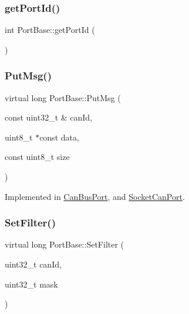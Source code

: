 \subsubsection{\texorpdfstring{get\+Port\+Id()}{getPortId()}}
{\footnotesize\ttfamily int Port\+Base\+::get\+Port\+Id (\begin{DoxyParamCaption}{ }\end{DoxyParamCaption})}

\mbox{\label{classPortBase_a26213ebb6ea0a0b77f60c28944e3bb8e}} 
\subsubsection{\texorpdfstring{Put\+Msg()}{PutMsg()}}
{\footnotesize\ttfamily virtual long Port\+Base\+::\+Put\+Msg (\begin{DoxyParamCaption}\item[{const uint32\+\_\+t \&}]{can\+Id,  }\item[{uint8\+\_\+t $\ast$const}]{data,  }\item[{const uint8\+\_\+t}]{size }\end{DoxyParamCaption})\hspace{0.3cm}{\ttfamily [pure virtual]}}



Implemented in \hyperlink{classCanBusPort_a2bb802ad7a14e260f0f51b79d4c53c43}{Can\+Bus\+Port}, and \hyperlink{classSocketCanPort_a9375a0c1e33978c83ebd188100898633}{Socket\+Can\+Port}.

\mbox{\label{classPortBase_a1d857a81a8e3f3bd460ef7c802ee762c}} 
\subsubsection{\texorpdfstring{Set\+Filter()}{SetFilter()}}
{\footnotesize\ttfamily virtual long Port\+Base\+::\+Set\+Filter (\begin{DoxyParamCaption}\item[{uint32\+\_\+t}]{can\+Id,  }\item[{uint32\+\_\+t}]{mask }\end{DoxyParamCaption})\hspace{0.3cm}{\ttfamily [pure virtual]}}



